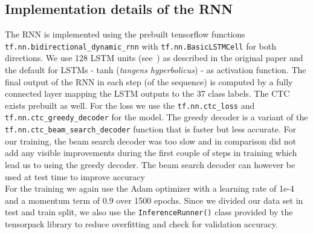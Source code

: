 \documentclass{utue} %
\begin{document}
\subsection{Implementation details of the RNN}
The RNN is implemented using the prebuilt tensorflow functions \texttt{tf.nn.bidirectional\_dynamic\_rnn} with \texttt{tf.nn.BasicLSTMCell} for both directions. We use 128 LSTM units (see~\cite{lstmpaper}) as described in the original paper and the default for LSTMs - tanh (\textit{tangens hyperbolicus}) - as activation function. The final output of the RNN in each step (of the sequence) is computed by a fully connected layer mapping the LSTM outputs to the 37 class labels.
The CTC exists prebuilt as well. For the loss we use the \texttt{tf.nn.ctc\_loss} and \texttt{tf.nn.ctc\_greedy\_decoder} for the model. The greedy decoder is a variant of the \texttt{tf.nn.ctc\_beam\_search\_decoder} function that is faster but less accurate. For our training, the beam search decoder was too slow and in comparison did not add any visible improvements during the first couple of steps in training which lead us to using the greedy decoder. The beam search decoder can however be used at test time to improve accuracy\\
For the training we again use the Adam optimizer with a learning rate of 1e-4 and a momentum term of 0.9 over 1500 epochs. Since we divided our data set in test and train split, we also use the \texttt{InferenceRunner()} class provided by the tensorpack library to reduce overfitting and check for validation accuracy. 
\end{document}
